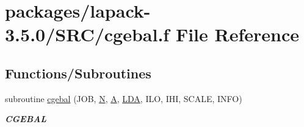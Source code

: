 \hypertarget{cgebal_8f}{}\section{packages/lapack-\/3.5.0/\+S\+R\+C/cgebal.f File Reference}
\label{cgebal_8f}
\subsection*{Functions/\+Subroutines}
\begin{DoxyCompactItemize}
\item 
subroutine \hyperlink{group__complexGEcomputational_ga5298bb6589a104e31eb5d832f2d9d498}{cgebal} (J\+O\+B, \hyperlink{polmisc_8c_a0240ac851181b84ac374872dc5434ee4}{N}, \hyperlink{classA}{A}, \hyperlink{example__user_8c_ae946da542ce0db94dced19b2ecefd1aa}{L\+D\+A}, I\+L\+O, I\+H\+I, S\+C\+A\+L\+E, I\+N\+F\+O)
\begin{DoxyCompactList}\small\item\em {\bfseries C\+G\+E\+B\+A\+L} \end{DoxyCompactList}\end{DoxyCompactItemize}
